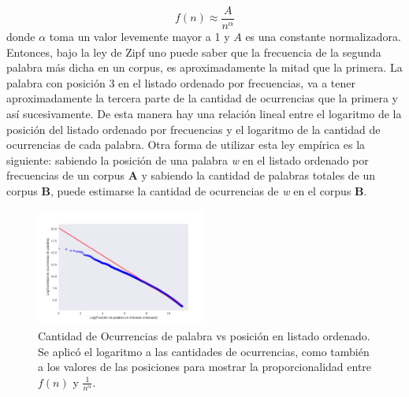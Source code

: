 $$f(n) \approx \frac{A}{n^{\alpha}}$$
donde $\alpha$ toma un valor levemente mayor a 1 y $A$ es una constante normalizadora.
Entonces, bajo la ley de Zipf uno puede saber que la frecuencia de la segunda palabra más dicha en un corpus, es aproximadamente la mitad que la primera. La palabra con posición 3 en el listado ordenado por frecuencias, va a tener aproximadamente la tercera parte de la cantidad de ocurrencias que la primera y así sucesivamente. De esta manera hay una relación lineal entre el logaritmo de la posición del listado ordenado por frecuencias y el logaritmo de la cantidad de ocurrencias de cada palabra.
Otra forma de utilizar esta ley empírica es la siguiente:
sabiendo la posición de una palabra \textit{w} en el listado ordenado por frecuencias de un corpus \textbf{A} y sabiendo la cantidad de palabras totales de un corpus \textbf{B}, puede estimarse la cantidad de ocurrencias de \textit{w} en el corpus \textbf{B}.

\begin{figure}[!ht]
\centering
\includegraphics[width=0.5\textwidth]{./images/zipf.pdf}
\caption{Cantidad de Ocurrencias de palabra vs posición en listado ordenado. Se aplicó el logaritmo a las cantidades de ocurrencias, como también a los valores de las posiciones para mostrar la proporcionalidad entre $f(n)$ y $\frac{1}{n^{\alpha}}$.} 
\label{fig:zipf} 
\end{figure}






